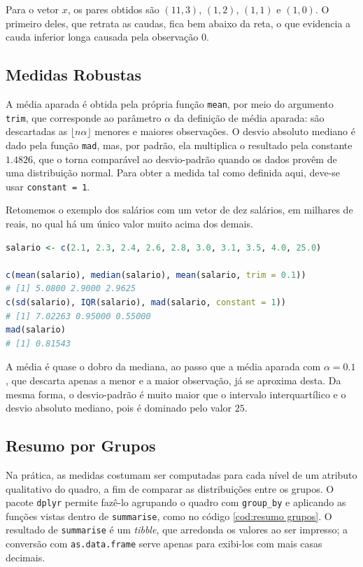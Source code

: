 Para o vetor $x$, os pares obtidos são $(11, 3)$, $(1, 2)$, $(1, 1)$ e $(1, 0)$.
O primeiro deles, que retrata as caudas, fica bem abaixo da reta, o que evidencia a
cauda inferior longa causada pela observação $0$.

\subsection{Medidas Robustas}

A média aparada é obtida pela própria função \texttt{mean}, por meio do argumento
\texttt{trim}, que corresponde ao parâmetro $\alpha$ da definição de média aparada:
são descartadas as $\lfloor n\alpha \rfloor$ menores e maiores observações.
O desvio absoluto mediano é dado pela função \texttt{mad}, mas, por padrão, ela multiplica
o resultado pela constante $1.4826$, que o torna comparável ao desvio-padrão quando os dados
provêm de uma distribuição normal.
Para obter a medida tal como definida aqui, deve-se usar \texttt{constant = 1}.

Retomemos o exemplo dos salários com um vetor de dez salários, em milhares de reais, no
qual há um único valor muito acima dos demais.

\begin{lstlisting}[language=R, caption={Medidas Robustas}, label={cod:robustas}]
salario <- c(2.1, 2.3, 2.4, 2.6, 2.8, 3.0, 3.1, 3.5, 4.0, 25.0)

c(mean(salario), median(salario), mean(salario, trim = 0.1))
# [1] 5.0800 2.9000 2.9625
c(sd(salario), IQR(salario), mad(salario, constant = 1))
# [1] 7.02263 0.95000 0.55000
mad(salario)
# [1] 0.81543
\end{lstlisting}

A média é quase o dobro da mediana, ao passo que a média aparada com $\alpha = 0.1$, que
descarta apenas a menor e a maior observação, já se aproxima desta.
Da mesma forma, o desvio-padrão é muito maior que o intervalo interquartílico e o desvio
absoluto mediano, pois é dominado pelo valor $25$.

\subsection{Resumo por Grupos}

Na prática, as medidas costumam ser computadas para cada nível de um atributo
qualitativo do quadro, a fim de comparar as distribuições entre os grupos.
O pacote \texttt{dplyr} permite fazê-lo agrupando o quadro com \texttt{group\_by} e
aplicando as funções vistas dentro de \texttt{summarise}, como no código
\ref{cod:resumo grupos}.
O resultado de \texttt{summarise} é um \textit{tibble}, que arredonda os valores ao ser
impresso; a conversão com \texttt{as.data.frame} serve apenas para exibi-los com mais
casas decimais.

